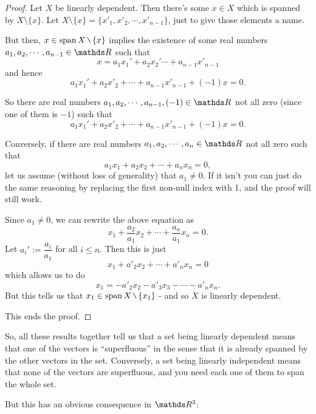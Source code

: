 \begin{proof}
	Let $X$ be linearly dependent. Then there's some $x\in X$ which is spanned by $X\setminus\{x\}$. Let $X\setminus\{x\}=\{x'_1,x'_2,\cdots,x'_{n-1}\}$, just to give those elements a name.
	
	But then, $x\in\spen X\setminus\{x\}$ implies the existence of some real numbers $a_1,a_2,\cdots,a_{n-1}\in \R$ such that
	\[x=a_1x_1'+a_2x_2'\cdots+a_{n-1}x'_{n-1}\]and hence
	\[a_1x_1'+a_2x'_2+\cdots+a_{n-1}x'_{n-1}+(-1)x=0.\]
	
	So there are real numbers $a_1,a_2,\cdots,a_{n-1},(-1)\in \R$ not all zero (since one of them is $-1$) such that
	\[a_1x_1'+a_2x'_2+\cdots+a_{n-1}x'_{n-1}+(-1)x=0.\]
	
	\bigskip
	Conversely, if there are real numbers $a_1,a_2,\cdots,a_n\in \R$ not all zero such that
	\[a_1x_1+a_2x_2+\cdots+a_nx_n=0,\]let us assume (without loss of generality) that $a_1\neq 0$. If it isn't you can just do the same reasoning by replacing the first non-null index with 1, and the proof will still work.
	
	Since $a_1\neq 0$, we can rewrite the above equation as
	\[x_1+\frac{a_2}{a_1}x_2+\cdots+\frac{a_n}{a_1}x_n=0.\]Let $a_i':=\dfrac{a_i}{a_1}$ for all $i\leq n$. Then this is just
	\[x_1+a'_2x_2+\cdots+a'_nx_n=0\] which allows us to do
	\[x_1=-a'_2x_2-a'_3x_3-\cdots-a'_nx_n.\]But this tells us that $x_1\in\spen X\setminus\{x_1\}$ - and so $X$ is linearly dependent.
	
	This ends the proof.
\end{proof}

So, all these results together tell us that a set being linearly dependent means that one of the vectors is ``superfluous'' in the sense that it is already spanned by the other vectors in the set. Conversely, a set being linearly independent means that none of the vectors are superfluous, and you need each one of them to span the whole set.

But this has an obvious consequence in $\R^3$:

